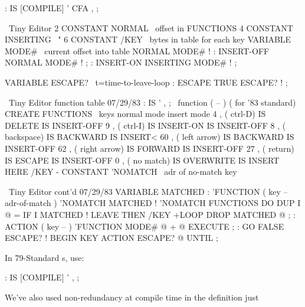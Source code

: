 \begin{Code}
: IS   [COMPILE] '  CFA , ;
\end{Code}
\begin{figure*}[tttp]
\setcounter{screen}{30}
\begin{Screen}
\ Tiny Editor
2 CONSTANT NORMAL     \ offset in FUNCTIONS
4 CONSTANT INSERTING  \        "
6 CONSTANT /KEY       \ bytes in table for each key
VARIABLE MODE#        \ current offset into table
NORMAL MODE# !
: INSERT-OFF   NORMAL    MODE# ! ;
: INSERT-ON    INSERTING MODE# ! ;

VARIABLE ESCAPE?      \ t=time-to-leave-loop
: ESCAPE  TRUE ESCAPE? ! ;





\end{Screen}
\begin{Screen}
\ Tiny Editor             function table             07/29/83
: IS   ' , ;  \   function   ( -- )    ( for '83 standard)
CREATE FUNCTIONS
\ keys                  normal mode        insert mode
 4 ,  ( ctrl-D)         IS DELETE          IS INSERT-OFF
 9 ,  ( ctrl-I)         IS INSERT-ON       IS INSERT-OFF
 8 ,  ( backspace)      IS BACKWARD        IS INSERT<
60 ,  ( left arrow)     IS BACKWARD        IS INSERT-OFF
62 ,  ( right arrow)    IS FORWARD         IS INSERT-OFF
27 ,  ( return)         IS ESCAPE          IS INSERT-OFF
 0 ,  ( no match)       IS OVERWRITE       IS INSERT
HERE /KEY -  CONSTANT 'NOMATCH  \ adr of no-match key




\end{Screen}
\begin{Screen}
\ Tiny Editor cont'd                                 07/29/83
VARIABLE MATCHED
: 'FUNCTION  ( key -- adr-of-match )  'NOMATCH  MATCHED !
   'NOMATCH FUNCTIONS DO  DUP  I @ =  IF
     I MATCHED !  LEAVE  THEN  /KEY +LOOP  DROP
    MATCHED @ ;
: ACTION  ( key -- )  'FUNCTION  MODE# @ +  @ EXECUTE ;
: GO   FALSE ESCAPE? !  BEGIN  KEY ACTION  ESCAPE? @ UNTIL ;








\end{Screen}
\end{figure*}
In 79-Standard \Forth{}s, use:
\begin{Code}
: IS   [COMPILE] '  , ;
\end{Code}
We've also used non-redundancy at compile time in the definition just
